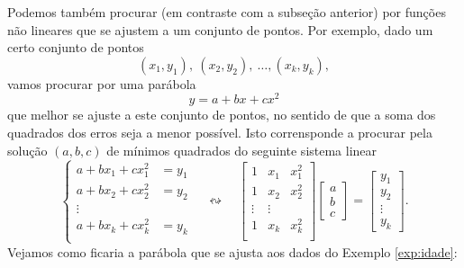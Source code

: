 \documentclass[../livro.tex]{subfiles}  %
\begin{document}
Podemos também procurar (em contraste com a subseção anterior) por funções não lineares que se ajustem a um conjunto de pontos. Por exemplo, dado um certo conjunto de pontos
\[
(x_1, y_1), \ (x_2, y_2), \ \dots, (x_k, y_k),
\] vamos procurar por uma parábola
\[
y = a + bx + cx^2
\] que melhor se ajuste a este conjunto de pontos, no sentido de que a soma dos quadrados dos erros seja a menor possível. Isto corrensponde a procurar pela solução $(a,b, c)$ de mínimos quadrados do seguinte sistema linear
\[
\left\{
  \begin{array}{rl}
    a + b x_1 + c x_1^2 &\!\!\!\!\!= y_1  \\
    a + b x_2 + c x_2^2 &\!\!\!\!\!= y_2  \\
    \vdots &  \\
    a + b x_k + c x_k^2 &\!\!\!\!\!= y_k  \\
  \end{array}
\right. \quad \leftrightsquigarrow  \quad
\begin{bmatrix}
  1 & x_1 & x_1^2 \\
  1 & x_2 & x_2^2 \\
  \vdots & \vdots \\
  1 & x_k & x_k^2 \\
\end{bmatrix}
\begin{bmatrix}
  a \\ b \\ c
\end{bmatrix} =
\begin{bmatrix}
  y_1 \\ y_2 \\ \vdots \\ y_k
\end{bmatrix}.
\] Vejamos como ficaria a parábola que se ajusta aos dados do Exemplo \ref{exp:idade}:
\end{document}
